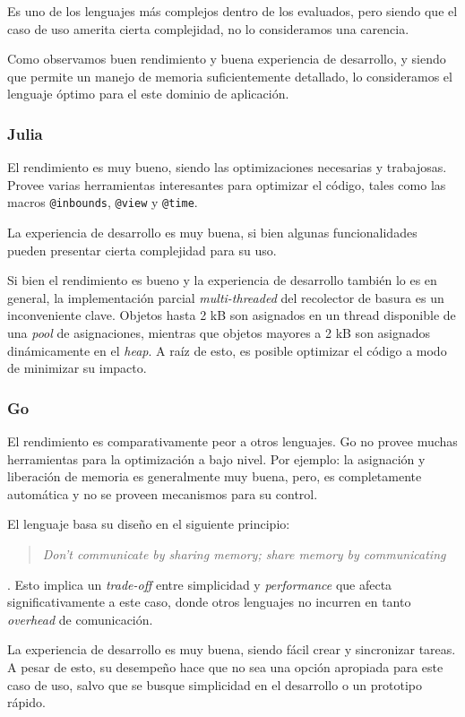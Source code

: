 \documentclass[11pt]{article}
\let\Oldsubsubsection\subsubsection
\renewcommand{\subsubsection}{\FloatBarrier\Oldsubsubsection}
\newcommand{\english}[1]{\textit{#1}}
\begin{document}
Es uno de los lenguajes más complejos dentro de los evaluados, pero siendo que el caso de uso amerita cierta complejidad, no lo consideramos una carencia.

Como observamos buen rendimiento y buena experiencia de desarrollo, y siendo que permite un manejo de memoria suficientemente detallado, lo consideramos el lenguaje óptimo para el este dominio de aplicación.

\subsubsection{Julia}

El rendimiento es muy bueno, siendo las optimizaciones necesarias y trabajosas. Provee varias herramientas interesantes para optimizar el código, tales como las macros \lstinline{@inbounds}, \lstinline{@view} y \lstinline{@time}.

La experiencia de desarrollo es muy buena, si bien algunas funcionalidades pueden presentar cierta complejidad para su uso.

Si bien el rendimiento es bueno y la experiencia de desarrollo también lo es en general, la implementación parcial \english{multi-threaded} del recolector de basura es un inconveniente clave. Objetos hasta 2 kB son asignados en un thread disponible de una \english{pool} de asignaciones, mientras que objetos mayores a 2 kB son asignados dinámicamente en el \english{heap}. A raíz de esto, es posible optimizar el código a modo de minimizar su impacto.

\subsubsection{Go}

El rendimiento es comparativamente peor a otros lenguajes. Go no provee muchas herramientas para la optimización a bajo nivel. Por ejemplo: la asignación y liberación de memoria es generalmente muy buena, pero, es completamente automática y no se proveen mecanismos para su control.

El lenguaje basa su diseño en el siguiente principio: \blockquote[\cite{go:ex:effective_concurrency}]{\english{Don't communicate by sharing memory; share memory by communicating}} . Esto implica un \english{trade-off} entre simplicidad y \english{performance} que afecta significativamente a este caso, donde otros lenguajes no incurren en tanto \english{overhead} de comunicación.

La experiencia de desarrollo es muy buena, siendo fácil crear y sincronizar tareas. A pesar de esto, su desempeño hace que no sea una opción apropiada para este caso de uso, salvo que se busque simplicidad en el desarrollo o un prototipo rápido.
\end{document}
